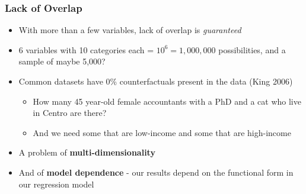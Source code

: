 \documentclass[xcolor=x11names,compress]{beamer}\usepackage[]{graphicx}\usepackage[]{color}
\renewcommand{\(}{\begin{columns}}
\renewcommand{\)}{\end{columns}}
\newcommand{\<}[1]{\begin{column}{#1}}
\renewcommand{\>}{\end{column}}
\begin{document}
\begin{frame}
\frametitle{Lack of Overlap}
\begin{itemize}
\item With more than a few variables, lack of overlap is \textit{guaranteed}
\item 6 variables with 10 categories each = $10^6 = 1,000,000$ possibilities, and a sample of maybe 5,000?
\item Common datasets have 0\% counterfactuals present in the data (King 2006)
\begin{itemize}
\item How many 45 year-old female accountants with a PhD and a cat who live in Centro are there?
\item And we need some that are low-income and some that are high-income
\end{itemize}
\item A problem of \textbf{multi-dimensionality}
\item And of \textbf{model dependence} - our results depend on the functional form in our regression model
\end{itemize}
\end{frame}






\end{document}
